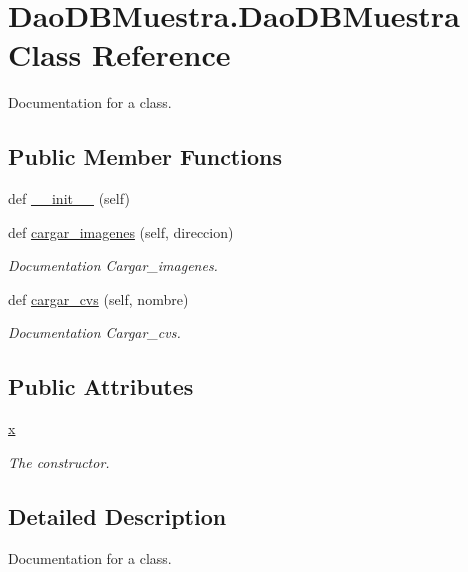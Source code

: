 \hypertarget{class_dao_d_b_muestra_1_1_dao_d_b_muestra}{}\section{Dao\+D\+B\+Muestra.\+Dao\+D\+B\+Muestra Class Reference}
\label{class_dao_d_b_muestra_1_1_dao_d_b_muestra}


Documentation for a class.  


\subsection*{Public Member Functions}
\begin{DoxyCompactItemize}
\item 
def \mbox{\hyperlink{class_dao_d_b_muestra_1_1_dao_d_b_muestra_a2afebcfa528b35baac5ac22efe078023}{\+\_\+\+\_\+init\+\_\+\+\_\+}} (self)
\item 
def \mbox{\hyperlink{class_dao_d_b_muestra_1_1_dao_d_b_muestra_ac8915e56920d6c87dab593dff9a7bfdf}{cargar\+\_\+imagenes}} (self, direccion)
\begin{DoxyCompactList}\small\item\em Documentation Cargar\+\_\+imagenes. \end{DoxyCompactList}\item 
def \mbox{\hyperlink{class_dao_d_b_muestra_1_1_dao_d_b_muestra_abc274c9ad83d1efe49b2a3a3fb9173bf}{cargar\+\_\+cvs}} (self, nombre)
\begin{DoxyCompactList}\small\item\em Documentation Cargar\+\_\+cvs. \end{DoxyCompactList}\end{DoxyCompactItemize}
\subsection*{Public Attributes}
\begin{DoxyCompactItemize}
\item 
\mbox{\hyperlink{class_dao_d_b_muestra_1_1_dao_d_b_muestra_aa3ded640da73e60fd7371465deb482b6}{x}}
\begin{DoxyCompactList}\small\item\em The constructor. \end{DoxyCompactList}\end{DoxyCompactItemize}


\subsection{Detailed Description}
Documentation for a class. 

